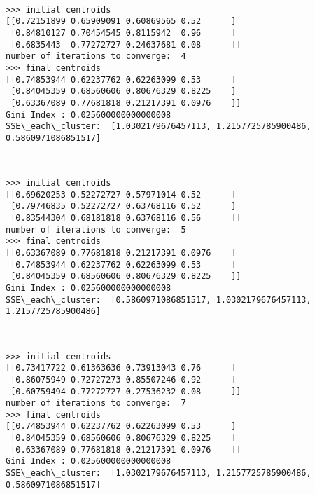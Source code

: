 \documentclass[11pt]{article}
\begin{document}
    \begin{center}
    \end{center}
    { \hspace*{\fill} \\}
    
    \begin{Verbatim}[commandchars=\\\{\}]
>>> initial centroids
[[0.72151899 0.65909091 0.60869565 0.52      ]
 [0.84810127 0.70454545 0.8115942  0.96      ]
 [0.6835443  0.77272727 0.24637681 0.08      ]]
number of iterations to converge:  4
>>> final centroids
[[0.74853944 0.62237762 0.62263099 0.53      ]
 [0.84045359 0.68560606 0.80676329 0.8225    ]
 [0.63367089 0.77681818 0.21217391 0.0976    ]]
Gini Index : 0.025600000000000008
SSE\_each\_cluster:  [1.0302179676457113, 1.2157725785900486, 0.5860971086851517]

    \end{Verbatim}

    \begin{center}
    \end{center}
    { \hspace*{\fill} \\}
    
    \begin{Verbatim}[commandchars=\\\{\}]
>>> initial centroids
[[0.69620253 0.52272727 0.57971014 0.52      ]
 [0.79746835 0.52272727 0.63768116 0.52      ]
 [0.83544304 0.68181818 0.63768116 0.56      ]]
number of iterations to converge:  5
>>> final centroids
[[0.63367089 0.77681818 0.21217391 0.0976    ]
 [0.74853944 0.62237762 0.62263099 0.53      ]
 [0.84045359 0.68560606 0.80676329 0.8225    ]]
Gini Index : 0.025600000000000008
SSE\_each\_cluster:  [0.5860971086851517, 1.0302179676457113, 1.2157725785900486]

    \end{Verbatim}

    \begin{center}
    \end{center}
    { \hspace*{\fill} \\}
    
    \begin{Verbatim}[commandchars=\\\{\}]
>>> initial centroids
[[0.73417722 0.61363636 0.73913043 0.76      ]
 [0.86075949 0.72727273 0.85507246 0.92      ]
 [0.60759494 0.77272727 0.27536232 0.08      ]]
number of iterations to converge:  7
>>> final centroids
[[0.74853944 0.62237762 0.62263099 0.53      ]
 [0.84045359 0.68560606 0.80676329 0.8225    ]
 [0.63367089 0.77681818 0.21217391 0.0976    ]]
Gini Index : 0.025600000000000008
SSE\_each\_cluster:  [1.0302179676457113, 1.2157725785900486, 0.5860971086851517]

    \end{Verbatim}
\end{document}
